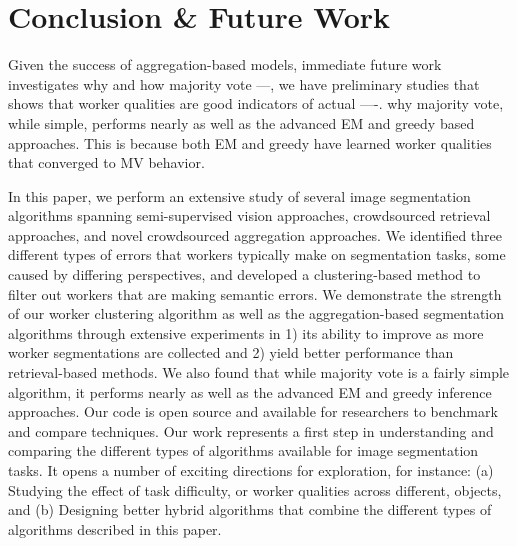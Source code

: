 \section{Conclusion \& Future Work}
Given the success of aggregation-based models, immediate future work investigates why and how majority vote ---, we have preliminary studies that shows that worker qualities are good indicators of actual ----.  why majority vote, while simple, performs nearly as well as the advanced EM and greedy based approaches. This is because both EM and greedy have learned worker qualities that converged to MV behavior.
   

In this paper, we perform an extensive study of several image segmentation algorithms spanning semi-supervised vision approaches, crowdsourced retrieval approaches, and novel crowdsourced aggregation approaches. We identified three different types of errors that workers typically make on segmentation tasks, some caused by differing perspectives, and developed a clustering-based method to filter out workers that are making semantic errors. We demonstrate the strength of our worker clustering algorithm as well as the aggregation-based segmentation algorithms through extensive experiments in 1) its ability to improve as more worker segmentations are collected and 2) yield better performance than retrieval-based methods. We also found that while majority vote is a fairly simple algorithm, it performs nearly as well as the advanced EM and greedy inference approaches. Our code is open source and available for researchers to benchmark and compare techniques. Our work represents a first step in understanding and comparing the different types of algorithms available for image segmentation tasks. It opens a number of exciting directions for exploration, for instance: (a) Studying the effect of task difficulty, or worker qualities across different, objects, and (b) Designing better hybrid algorithms that combine the different types of algorithms described in this paper.